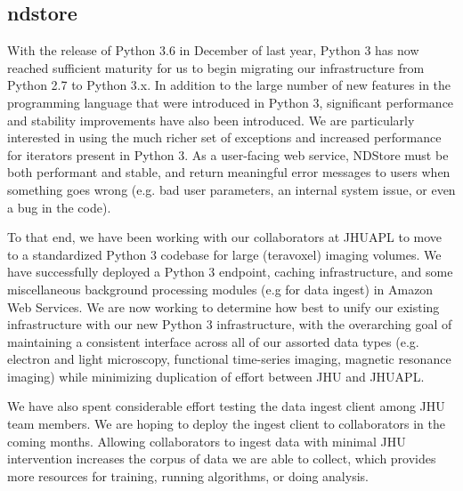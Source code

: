 \documentclass[simplex.tex]{subfiles}
\begin{document}
\subsection{ndstore}

With the release of Python 3.6 in December of last year, Python 3 has now reached sufficient maturity for us to begin migrating our infrastructure from Python 2.7 to Python 3.x. In addition to the large number of new features in the programming language that were introduced in Python 3, significant performance and stability improvements have also been introduced. We are particularly interested in using the much richer set of exceptions and increased performance for iterators present in Python 3. As a user-facing web service, NDStore must be both performant and stable, and return meaningful error messages to users when something goes wrong (e.g. bad user parameters, an internal system issue, or even a bug in the code). 

To that end, we have been working with our collaborators at JHUAPL to move to a standardized Python 3 codebase for large (teravoxel) imaging volumes. We have successfully deployed a Python 3 endpoint, caching infrastructure, and some miscellaneous background processing modules (e.g for data ingest) in Amazon Web Services. We are now working to determine how best to unify our existing infrastructure with our new Python 3 infrastructure, with the overarching goal of maintaining a consistent interface across all of our assorted data types (e.g. electron and light microscopy, functional time-series imaging, magnetic resonance imaging) while minimizing duplication of effort between JHU and JHUAPL. 

We have also spent considerable effort testing the data ingest client among JHU team members. We are hoping to deploy the ingest client to collaborators in the coming months. Allowing collaborators to ingest data with minimal JHU intervention increases the corpus of data we are able to collect, which provides more resources for training, running algorithms, or doing analysis. 

\clearpage
\end{document}
